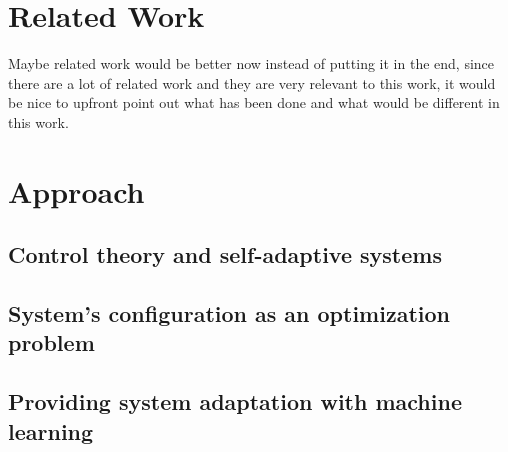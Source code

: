 
\section{Related Work}

Maybe related work would be better now instead of putting it in the end, since there are a lot of related work and they are very relevant to this work, it would be nice to upfront point out what has been done and what would be different in this work.


\section{Approach}

\subsection{Control theory and self-adaptive systems}

\subsection{System's configuration as an optimization problem}

\subsection{Providing system adaptation with machine learning}

